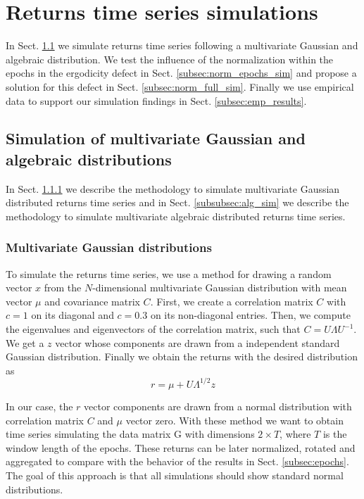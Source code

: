 \section{Returns time series simulations}
\label{sec:simulations}

In Sect. \ref{subsec:gauss_alg_sim} we simulate returns time series following
a multivariate Gaussian and algebraic distribution. We test the influence of
the normalization within the epochs in the ergodicity defect in Sect.
\ref{subsec:norm_epochs_sim} and propose a solution for this defect in Sect.
\ref{subsec:norm_full_sim}. Finally we use empirical data to support our
simulation findings in Sect. \ref{subsec:emp_results}.

\subsection{Simulation of multivariate Gaussian and algebraic distributions}
\label{subsec:gauss_alg_sim}

In Sect. \ref{subsubsec:gauss_sim} we describe the methodology to simulate
multivariate Gaussian distributed returns time series and in Sect.
\ref{subsubsec:alg_sim} we describe the methodology to simulate multivariate
algebraic distributed returns time series.

\subsubsection{Multivariate Gaussian distributions}\label{subsubsec:gauss_sim}

To simulate the returns time series, we use a method \cite{drawing_dist} for
drawing a random vector $x$ from the $N$-dimensional multivariate Gaussian
distribution with mean vector $\mu$ and covariance matrix $C$. First, we create
a correlation matrix $C$ with $c = 1$ on its diagonal and $c = 0.3$ on its
non-diagonal entries. Then, we compute the eigenvalues and eigenvectors of the
correlation matrix, such that $C = U \Lambda U^{-1}$. We get a $z$ vector whose
components are drawn from a independent standard Gaussian distribution. Finally
we obtain the returns with the desired distribution as
\begin{equation}
    r = \mu + U \Lambda^{1/2} z
\end{equation}

In our case, the $r$ vector components are drawn from a normal distribution
with correlation matrix $C$ and $\mu$ vector zero.
With these method we want to obtain time series simulating the data matrix G
with dimensions $2 \times T$, where $T$ is the window length of the epochs.
These returns can be later normalized, rotated and aggregated to compare with
the behavior of the results in Sect. \ref{subsec:epochs}.  The goal of this
approach is that all simulations should show standard normal distributions.

